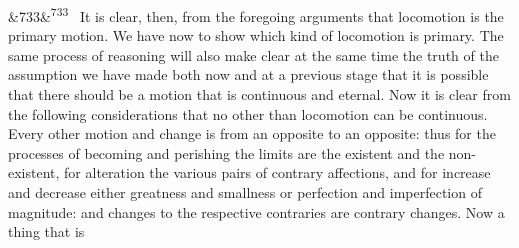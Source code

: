 \documentclass[12pt]{article}
\newcommand{\para}[1][]{\par\noindent\ifx&#1&\else\textsuperscript{\footnotesize #1}~\fi}
\begin{document}
\para[733] It is clear, then, from the foregoing arguments that locomotion is the primary motion. We have now to show which kind of locomotion is primary. The same process of reasoning will also make clear at the same time the truth of the assumption we have made both now and at a previous stage that it is possible that there should be a motion that is continuous and eternal. Now it is clear from the following considerations that no other than locomotion can be continuous. Every other motion and change is from an opposite to an opposite: thus for the processes of becoming and perishing the limits are the existent and the non-existent, for alteration the various pairs of contrary affections, and for increase and decrease either greatness and smallness or perfection and imperfection of magnitude: and changes to the respective contraries are contrary changes. Now a thing that is
\end{document}
